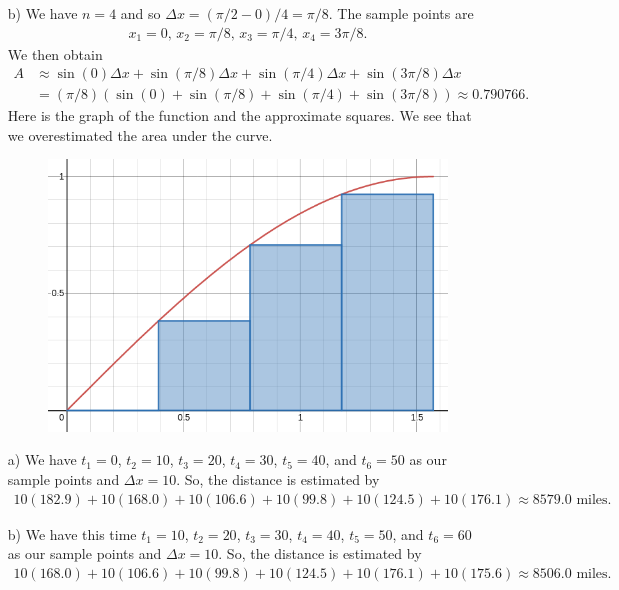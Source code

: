 \begin{enumerate}
	\item[b)] We have $n = 4$ and so $\Delta x = (\pi/2 - 0)/4 = \pi/8$. The sample points are
		\begin{align*}
		x_1 = 0, \, x_2 = \pi/8 , \, x_3 = \pi/4 , \, x_4 = 3\pi/8 .
		\end{align*}
	We then obtain
		\begin{align*}
		A &\approx \sin (0) \Delta x + \sin (\pi/8 ) \Delta x + \sin (\pi/4 ) \Delta x + \sin (3\pi/8 ) \Delta x \\
		&= (\pi/8 ) (\sin (0) + \sin (\pi/8 ) + \sin (\pi/4 ) + \sin (3\pi/8 ) )  \approx 0.790766 .
		\end{align*}
	Here is the graph of the function and the approximate squares. 	We see that we overestimated the area under the curve.
		\begin{figure}[ht]
		\centering
		\includegraphics[scale=0.3]{Number4_41.png}
		\end{figure}

	\end{enumerate}
	
	\spc
	
	\begin{enumerate}
	\item[a)] We have $t_1 = 0$, $t_2 = 10$, $t_3 = 20$, $t_4 = 30$, $t_5 = 40$, and $t_6 = 50$ as our sample points and $\Delta x = 10$. So, the distance is estimated by
		\begin{align*}
		10(182.9) + 10(168.0) + 10(106.6) + 10(99.8)+10(124.5)+10(176.1) \approx 8579.0 \text{ miles.}
		\end{align*}
	\item[b)] We have this time $t_1 = 10$, $t_2 = 20$, $t_3 = 30$, $t_4 = 40$, $t_5 = 50$, and $t_6 = 60$ as our sample points and $\Delta x = 10$. So, the distance is estimated by
		\begin{align*}
		10(168.0) + 10(106.6) + 10(99.8) + 10(124.5) + 10(176.1) + 10(175.6) \approx 8506.0 \text{ miles.}
		\end{align*}
	\end{enumerate}
	
